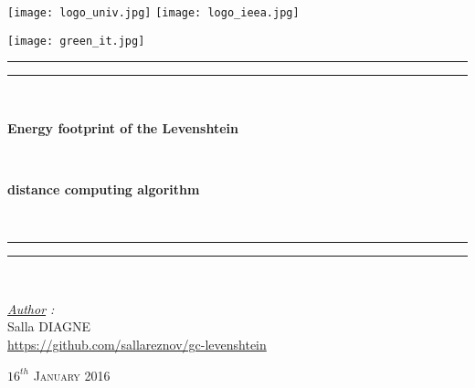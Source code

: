 \thispagestyle{cover}

\texttt{[image: logo\_univ.jpg]}
 \hfill \texttt{[image: logo\_ieea.jpg]} \\

\vspace*{7mm}

\begin{center}
	
	\texttt{[image: green\_it.jpg]}
	
	\vspace*{12mm}	

	\rule[0.5ex]{\linewidth}{2pt}\vspace*{-\baselineskip}\vspace*{3.2pt}
	\rule[0.5ex]{\linewidth}{1pt}\\[\baselineskip]

		\begin{Huge} \textbf{Energy footprint of the Levenshtein} \end{Huge}\\[4mm]
		\begin{Huge} \textbf{distance computing algorithm} \end{Huge}\\[4mm]
	\rule[0.5ex]{\linewidth}{1pt}\vspace*{-\baselineskip}\vspace{3.2pt}
	\rule[0.5ex]{\linewidth}{2pt}\\

	\vspace*{20mm}

	{\LARGE \textit{\underline{Author} :}}\\
	\vspace*{6mm}
	{\LARGE Salla DIAGNE}\\
	\vspace*{4mm}
	{\LARGE \url{https://github.com/sallareznov/gc-levenshtein}}
	\vspace*{20mm}
	
	{\LARGE\textsc{$16^{th}$ January 2016}}
\end{center}